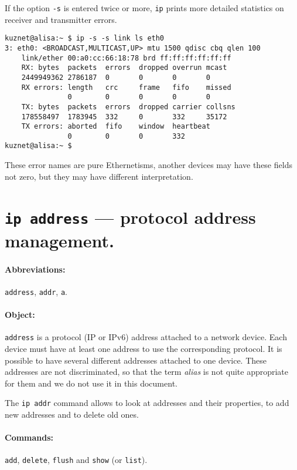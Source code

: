 If the option \verb|-s| is entered twice or more,
\verb|ip| prints more detailed statistics on receiver
and transmitter errors.

\begin{verbatim}
kuznet@alisa:~ $ ip -s -s link ls eth0
3: eth0: <BROADCAST,MULTICAST,UP> mtu 1500 qdisc cbq qlen 100
    link/ether 00:a0:cc:66:18:78 brd ff:ff:ff:ff:ff:ff
    RX: bytes  packets  errors  dropped overrun mcast   
    2449949362 2786187  0       0       0       0      
    RX errors: length   crc     frame   fifo    missed
               0        0       0       0       0      
    TX: bytes  packets  errors  dropped carrier collsns 
    178558497  1783945  332     0       332     35172  
    TX errors: aborted  fifo    window  heartbeat
               0        0       0       332    
kuznet@alisa:~ $
\end{verbatim}
These error names are pure Ethernetisms, another devices
may have these fields not zero, but they may have different
interpretation.


\section{{\tt ip address} --- protocol address management.}

\paragraph{Abbreviations:} \verb|address|, \verb|addr|, \verb|a|.

\paragraph{Object:} \verb|address| is a protocol (IP or IPv6) address attached
to a network device. Each device must have at least one address
to use the corresponding protocol. It is possible to have several
different addresses attached to one device. These addresses are not
discriminated, so that the term {\em alias\/} is not quite appropriate
for them and we do not use it in this document.

The \verb|ip addr| command allows to look at addresses and their properties,
to add new addresses and to delete old ones.

\paragraph{Commands:} \verb|add|, \verb|delete|, \verb|flush| and \verb|show|
(or \verb|list|).


